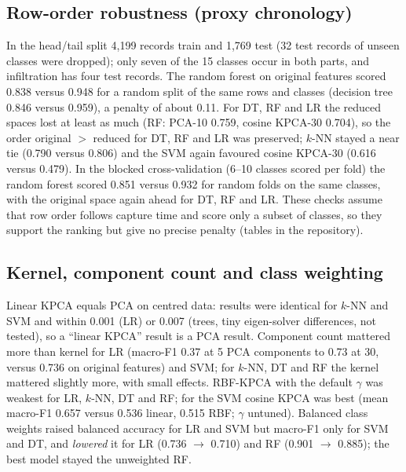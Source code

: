 \documentclass[runningheads]{llncs}
\begin{document}
\begin{table}[htbp]
\caption{Nested hyper-parameter search: mean macro-F1 over five outer folds. For each setting (default, tuned) the best reduced space among PCA-30, KPCA-cos-30 and KPCA-RBF-30 is chosen by that setting\textquoteright s own score; $\Delta$ = original $-$ reduced (negative: reduction better). K-cos-30 = KPCA, cosine kernel, 30 components. The last column gives the default-setting gap measured in the tuned-best reduced space.}\label{tab:tuning}
\centering\scriptsize
\resizebox{\textwidth}{!}{}
\end{table}

\subsection{Row-order robustness (proxy chronology)}
In the head/tail split 4{,}199 records train and 1{,}769 test (32 test records of unseen classes were dropped); only seven of the 15 classes occur in both parts, and infiltration has four test records. The random forest on original features scored 0.838 versus 0.948 for a random split of the same rows and classes (decision tree 0.846 versus 0.959), a penalty of about 0.11. For DT, RF and LR the reduced spaces lost at least as much (RF: PCA-10 0.759, cosine KPCA-30 0.704), so the order original $>$ reduced for DT, RF and LR was preserved; $k$-NN stayed a near tie (0.790 versus 0.806) and the SVM again favoured cosine KPCA-30 (0.616 versus 0.479). In the blocked cross-validation (6--10 classes scored per fold) the random forest scored 0.851 versus 0.932 for random folds on the same classes, with the original space again ahead for DT, RF and LR. These checks assume that row order follows capture time and score only a subset of classes, so they support the ranking but give no precise penalty (tables in the repository).





\subsection{Kernel, component count and class weighting}
Linear KPCA equals PCA on centred data: results were identical for $k$-NN and SVM and within 0.001 (LR) or 0.007 (trees, tiny eigen-solver differences, not tested), so a ``linear KPCA'' result is a PCA result. Component count mattered more than kernel for LR (macro-F1 0.37 at 5 PCA components to 0.73 at 30, versus 0.736 on original features) and SVM; for $k$-NN, DT and RF the kernel mattered slightly more, with small effects. RBF-KPCA with the default $\gamma$ was weakest for LR, $k$-NN, DT and RF; for the SVM cosine KPCA was best (mean macro-F1 0.657 versus 0.536 linear, 0.515 RBF; $\gamma$ untuned). Balanced class weights raised balanced accuracy for LR and SVM but macro-F1 only for SVM and DT, and \emph{lowered} it for LR (0.736 $\to$ 0.710) and RF (0.901 $\to$ 0.885); the best model stayed the unweighted RF.
\end{document}
